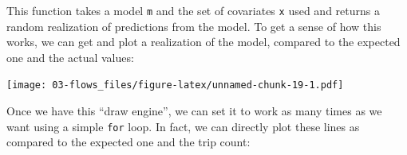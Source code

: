 \documentclass[]{book}
\newenvironment{Shaded}{\begin{snugshade}}{\end{snugshade}}
\newcommand{\KeywordTok}[1]{\textcolor[rgb]{0.13,0.29,0.53}{\textbf{#1}}}
\newcommand{\DataTypeTok}[1]{\textcolor[rgb]{0.13,0.29,0.53}{#1}}
\newcommand{\DecValTok}[1]{\textcolor[rgb]{0.00,0.00,0.81}{#1}}
\newcommand{\StringTok}[1]{\textcolor[rgb]{0.31,0.60,0.02}{#1}}
\newcommand{\OperatorTok}[1]{\textcolor[rgb]{0.81,0.36,0.00}{\textbf{#1}}}
\newcommand{\NormalTok}[1]{#1}
\begin{document}
This function takes a model \texttt{m} and the set of covariates
\texttt{x} used and returns a random realization of predictions from the
model. To get a sense of how this works, we can get and plot a
realization of the model, compared to the expected one and the actual
values:

\begin{Shaded}
\end{Shaded}

\texttt{[image: 03-flows\_files/figure-latex/unnamed-chunk-19-1.pdf]}

Once we have this ``draw engine'', we can set it to work as many times
as we want using a simple \texttt{for} loop. In fact, we can directly
plot these lines as compared to the expected one and the trip count:
\end{document}
